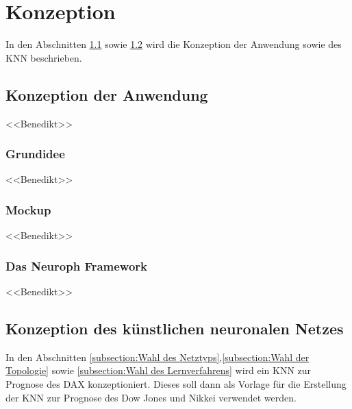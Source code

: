 \chapter{Konzeption}
\label{chapter:Konzeption}

In den Abschnitten \ref{section:Konzeption der Anwendung} sowie \ref{section:Konzeption des künstlichen neuronalen Netzes} wird die Konzeption der Anwendung sowie des KNN beschrieben.

\section{Konzeption der Anwendung} %
\label{section:Konzeption der Anwendung} %
<<Benedikt>>
\Blindtext

\subsection{Grundidee} %
\label{subsection:Grundidee} %
<<Benedikt>>
\Blindtext

\subsection{Mockup} %
\label{subsection:Mockup} %
<<Benedikt>>
\Blindtext

\subsection{Das Neuroph Framework} %
\label{subsection:Das Neuroph Framework} %
<<Benedikt>>
\Blindtext

\section{Konzeption des künstlichen neuronalen Netzes}
\label{section:Konzeption des künstlichen neuronalen Netzes}

In den Abschnitten \ref{subsection:Wahl des Netztyps},\ref{subsection:Wahl der Topologie} sowie \ref{subsection:Wahl des Lernverfahrens} wird ein KNN zur Prognose des DAX konzeptioniert. Dieses soll dann  als Vorlage für die Erstellung der KNN zur Prognose des Dow Jones und Nikkei verwendet werden.

